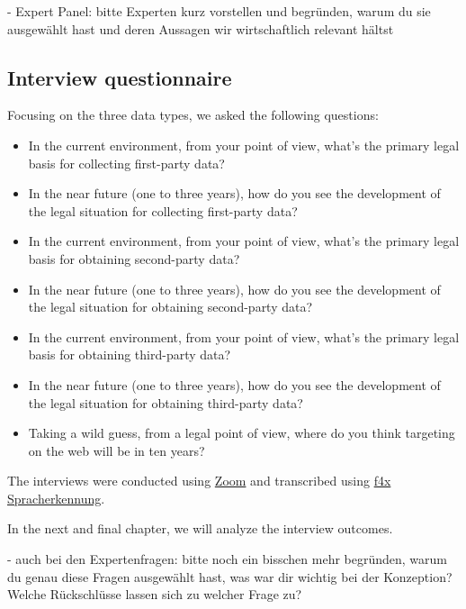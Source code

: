 - Expert Panel: bitte Experten kurz vorstellen und begründen, warum du sie ausgewählt hast und deren Aussagen wir wirtschaftlich relevant hältst

\subsection{Interview questionnaire}

Focusing on the three data types, we asked the following questions:

\begin{itemize}
 \item In the current environment, from your point of view, what's the primary legal basis for collecting first-party data?
 \item In the near future (one to three years), how do you see the development of the legal situation for collecting first-party data?
 \item In the current environment, from your point of view, what's the primary legal basis for obtaining second-party data?
 \item In the near future (one to three years), how do you see the development of the legal situation for obtaining second-party data?
 \item In the current environment, from your point of view, what's the primary legal basis for obtaining third-party data?
 \item In the near future (one to three years), how do you see the development of the legal situation for obtaining third-party data?
 \item Taking a wild guess, from a legal point of view, where do you think targeting on the web will be in ten years?
\end{itemize}

The interviews were conducted using \href{https://zoom.us/}{Zoom} and transcribed using \href{https://f4x.audiotranskription.de/}{f4x Spracherkennung}.

In the next and final chapter, we will analyze the interview outcomes.

- auch bei den Expertenfragen: bitte noch ein bisschen mehr begründen, warum du genau diese Fragen ausgewählt hast, was war dir wichtig bei der Konzeption? Welche Rückschlüsse lassen sich zu welcher Frage zu?


